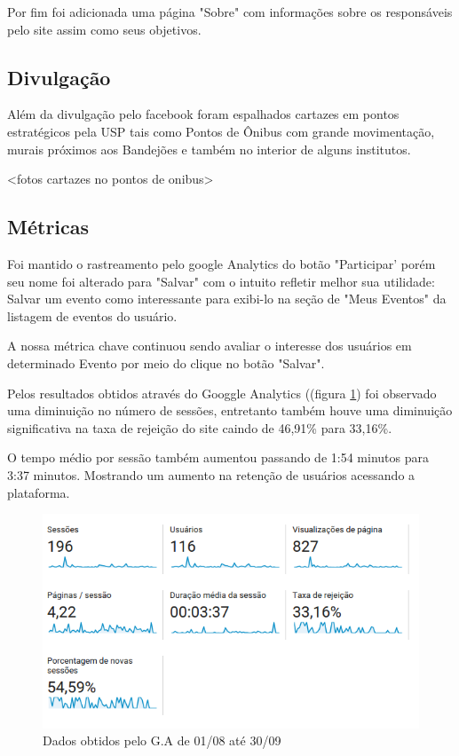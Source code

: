\par Por fim foi adicionada uma página "Sobre" com informações sobre os responsáveis pelo site assim como seus objetivos.
\subsection{Divulgação}
\par Além da divulgação pelo facebook foram espalhados cartazes em pontos estratégicos pela USP tais como Pontos de Ônibus com grande movimentação, murais próximos aos Bandejões e também no interior de alguns institutos.

<fotos cartazes no pontos de onibus>

\subsection{Métricas}

\par Foi mantido o rastreamento pelo google Analytics do botão "Participar' porém seu nome foi alterado para "Salvar" com o intuito refletir melhor sua utilidade: Salvar um evento como interessante para exibi-lo na seção de "Meus Eventos" da listagem de eventos do usuário.

\par A nossa métrica chave continuou sendo avaliar o interesse dos usuários em determinado Evento por meio do clique no botão "Salvar".

\par Pelos resultados obtidos através do Googgle Analytics ((figura \ref{fig:analytics_2ainteracao_dados}) foi observado uma diminuição no número de sessões, entretanto também houve uma diminuição significativa na taxa de rejeição do site caindo de 46,91\% para 33,16\%.
\par O tempo médio por sessão também aumentou passando de 1:54 minutos para 3:37 minutos. Mostrando um aumento na retenção de usuários acessando a plataforma.
\begin{figure}[htb]
\includegraphics[width=15cm]{figuras/analytics_2ainteracao_dados}
\caption{\label{fig:analytics_2ainteracao_dados} Dados obtidos pelo G.A de 01/08 até 30/09}
\end{figure}

